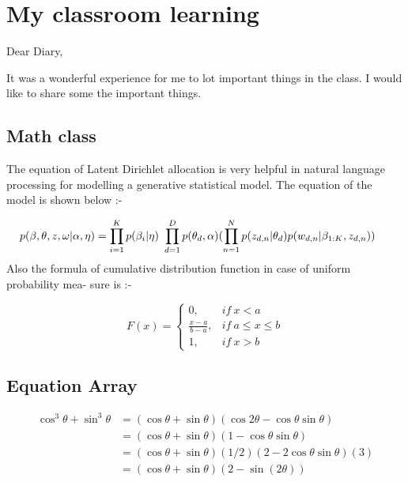 \documentclass{article}
\begin{document}
    \section{My classroom learning}\label{clslearn}
        Dear Diary,\par It was a wonderful experience for me to lot important things in the class. I would like to share some the important things.
        \subsection{Math class}
            The equation of Latent Dirichlet allocation is very helpful in natural language processing for modelling a generative statistical model. The equation of the model is shown below :-
            
            \begin{equation} \label{equation1}
            p(\beta, \theta, z, \omega|\alpha, \eta)=\prod_{i=1}^{K}p(\beta_i|\eta)\ \prod_{d=1}^{D}p(\theta_d,\alpha)(
            \prod_{n=1}^{N}p(z_{d,n}|\theta_d)p(w_{d,n}|\beta_{1:K},z_{d,n}))
            \hspace{.5cm}
            \end{equation}
            Also the formula of cumulative distribution function in case of uniform probability mea- sure is :-
            
            \begin{equation} \label{equation2}
            F(x)=\begin{cases}0, & if\ x<a \\ \frac{x-a}{b-a}, & if\ a\leq x \leq b \\ 1, & if\ x>b
            \end{cases}
            \end{equation}
        \subsection{Equation Array}
            \begin{align}
                \cos^3{\theta}+\sin^3{\theta} &= (\cos{\theta}+\sin{\theta})(\cos{2\theta-\cos\theta\sin\theta})\\
                &= (\cos{\theta}+\sin{\theta})(1-\cos\theta\sin\theta)\\
                &= (\cos{\theta}+\sin{\theta})(1/2)(2-2\cos\theta\sin\theta)(3)\\
                &= (\cos{\theta}+\sin{\theta})(2-\sin(2\theta))
            \end{align}
        
\end{document}
